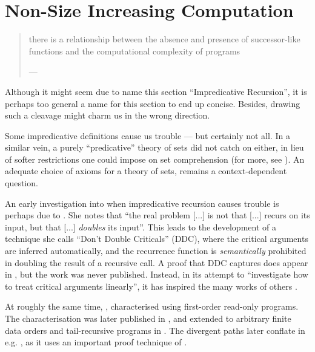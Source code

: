 \chapter{Non-Size Increasing Computation}

\begin{quotation}

\footnotesize\sffamily\itshape

\begin{flushright}

there is a relationship between the absence and presence of successor-like
functions and the computational complexity of programs

\smallbreak

\upshape

--- \cite{jones-kristiansen-2009}

\end{flushright}

\end{quotation}

Although it might seem due to name this section ``Impredicative Recursion'', it
is perhaps too general a name for this section to end up concise. Besides,
drawing such a cleavage might charm us in the wrong direction.

Some impredicative definitions cause us trouble --- but certainly not all.  In
a similar vein, a purely ``predicative'' theory of sets did not catch on
either, in lieu of softer restrictions one could impose on set comprehension
(for more, see \cite{feferman-1964}). An adequate choice of axioms for a theory
of sets, remains a context-dependent question.

An early investigation into when impredicative recursion causes trouble is
perhaps due to \cite{caseiro-1996}. She notes that ``the real problem [...] is
not that [...] recurs on its input, but that [...] \emph{doubles} its input''.
This leads to the development of a technique she calls ``Don't Double
Criticals'' (DDC), where the critical arguments are inferred automatically, and
the recurrence function is \emph{semantically} prohibited in doubling the
result of a recursive call. A proof that DDC captures \FPTIME{} does appear in
\cite{caseiro-1996}, but the work was never published. Instead, in its attempt
to ``investigate how to treat critical arguments linearly'', it has inspired
the many works of others \cite{bellantoni-et-al-2000,
aehlig-schwichtenberg-2002, hofmann-2003}.

At roughly the same time, \cite[\textsection~24]{jones-1997}, characterised
\PTIME{} using first-order read-only programs. The characterisation was later
published in \cite{jones-1999}, and extended to arbitrary finite data orders
and tail-recursive programs in \cite{jones-2001}. The divergent paths later
conflate in e.g. \cite{hofmann-2002}, as it uses an important proof technique
of \cite{jones-2001}.

